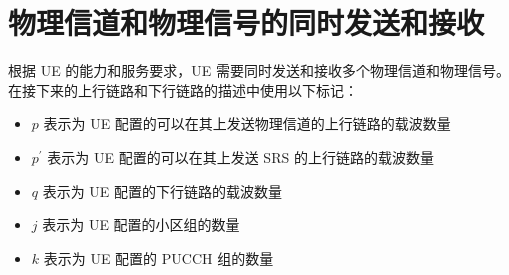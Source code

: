 \documentclass[cn,hazy,blue,14pt,screen,device=normal]{elegantnote}
\begin{document}
\section{物理信道和物理信号的同时发送和接收}
根据 UE 的能力和服务要求，UE 需要同时发送和接收多个物理信道和物理信号。在接下来的上行链路和下行链路的描述中使用以下标记：
\begin{itemize}[leftmargin=2cm]
	\item $p$ 表示为 UE 配置的可以在其上发送物理信道的上行链路的载波数量
	\item $p^{'}$ 表示为 UE 配置的可以在其上发送 SRS 的上行链路的载波数量
	\item $q$ 表示为 UE 配置的下行链路的载波数量
	\item $j$ 表示为 UE 配置的小区组的数量
	\item $k$ 表示为 UE 配置的 PUCCH 组的数量
\end{itemize}
\end{document}
